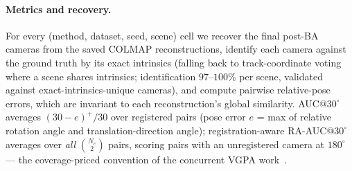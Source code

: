 \documentclass[10pt,twocolumn,letterpaper]{article}
\begin{document}
\paragraph{Metrics and recovery.} For every (method, dataset, seed, scene) cell we
recover the final post-BA cameras from the saved COLMAP reconstructions, identify each
camera against the ground truth by its exact intrinsics (falling back to
track-coordinate voting where a scene shares intrinsics; identification $97$--$100\%$
per scene, validated against exact-intrinsics-unique cameras), and compute pairwise
relative-pose errors, which are invariant to each reconstruction's global similarity.
AUC@$30^{\circ}$ averages $(30-e)^{+}/30$ over registered pairs (pose error $e$ = max
of relative rotation angle and translation-direction angle); registration-aware
RA-AUC@$30^{\circ}$ averages over \emph{all} $\binom{N_c}{2}$ pairs, scoring pairs with
an unregistered camera at $180^{\circ}$ --- the coverage-priced convention of the
concurrent VGPA work~\cite{vgpa}.
\end{document}
